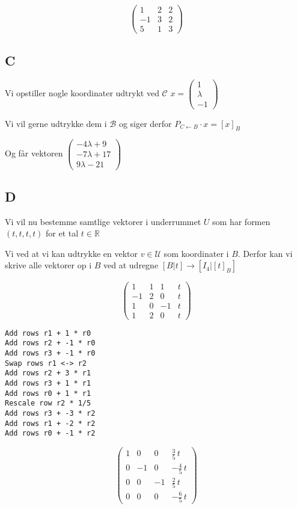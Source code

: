 \documentclass[11pt]{article}
\begin{document}
\[\left(\begin{array}{rrr}
         1 & 2 & 2 \\
         -1 & 3 & 2 \\
         5 & 1 & 3
\end{array}\right) \]
            
    \hypertarget{c}{%
\subsection{C}\label{c}}

Vi opstiller nogle koordinater udtrykt ved \(\mathcal{C}\)
\(x = \begin{pmatrix}1\\\lambda\\-1\end{pmatrix}\)

Vi vil gerne udtrykke dem i \(\mathcal{B}\) og siger derfor
\(P_{C\leftarrow B}\cdot x = [x]_B\)

    Og får vektoren
\(\begin{pmatrix}-4\lambda + 9\\ -7\lambda + 17\\ 9\lambda - 21 \end{pmatrix}\)

    \hypertarget{d}{%
\subsection{D}\label{d}}

Vi vil nu bestemme samtlige vektorer i underrummet \(U\) som har formen
\((t,t,t,t)\) for et tal \(t \in \mathbb{R}\)

Vi ved at vi kan udtrykke en vektor \(v \in \mathcal{U}\) som
koordinater i \(B\). Derfor kan vi skrive alle vektorer op i \(B\) ved
at udregne \([B|t] \rightarrow [I_4|[t]_B]\)

\[
\left(\begin{array}{rrrr}
1 & 1 & 1 & t \\
-1 & 2 & 0 & t \\
1 & 0 & -1 & t \\
1 & 2 & 0 & t
\end{array}\right)
\]
\begin{Verbatim}
Add rows r1 + 1 * r0
Add rows r2 + -1 * r0
Add rows r3 + -1 * r0
Swap rows r1 <-> r2
Add rows r2 + 3 * r1
Add rows r3 + 1 * r1
Add rows r0 + 1 * r1
Rescale row r2 * 1/5
Add rows r3 + -3 * r2
Add rows r1 + -2 * r2
Add rows r0 + -1 * r2
\end{Verbatim}
\[
\left(\begin{array}{rrrr}
	1 & 0 & 0 & \frac{3}{5} \, t \\
	0 & -1 & 0 & -\frac{4}{5} \, t \\
	0 & 0 & -1 & \frac{2}{5} \, t \\
	0 & 0 & 0 & -\frac{6}{5} \, t
\end{array}\right)
\]
\end{document}
